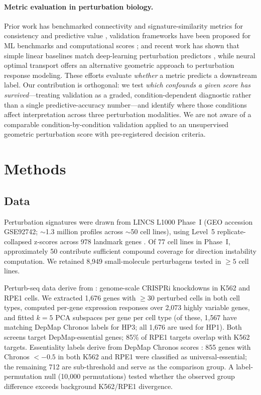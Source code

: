 \documentclass[11pt]{article}
\begin{document}
\paragraph{Metric evaluation in perturbation biology.}
Prior work has benchmarked connectivity and signature-similarity metrics
for consistency and predictive value
\citep{subramanian2017next,li2020comprehensive,napolitano2021reconciling},
validation
frameworks have been proposed for ML benchmarks and computational scores
\citep{freiesleben2025benchmarking,watson2025measuring}; and recent work
has shown that simple linear baselines match deep-learning perturbation
predictors \citep{ahlmanneltze2025baseline}, while neural optimal
transport \citep{bunne2023cellot} offers an alternative geometric
approach to perturbation response modeling. These efforts
evaluate \emph{whether} a metric predicts a downstream label. Our
contribution is orthogonal: we test \emph{which confounds a given score
has survived}---treating validation as a graded, condition-dependent
diagnostic rather than a single predictive-accuracy number---and
identify where those conditions affect interpretation across three
perturbation modalities. We are not aware of a comparable
condition-by-condition validation applied to an unsupervised geometric
perturbation score with pre-registered decision criteria.

\section{Methods}

\subsection{Data}

Perturbation signatures were drawn from LINCS L1000 Phase~I (GEO accession
GSE92742; $\sim$1.3 million profiles across $\sim$50 cell lines),
using Level~5 replicate-collapsed z-scores across 978 landmark genes
\citep{subramanian2017next,keenan2018library}. Of 77 cell lines in Phase~I,
approximately 50 contribute sufficient compound coverage for direction
instability computation. We retained 8{,}949
small-molecule perturbagens tested in $\geq5$ cell lines.

Perturb-seq data derive from \citet{replogle2022mapping}: genome-scale
CRISPRi knockdowns in K562 and RPE1 cells. We extracted 1{,}676 genes
with $\geq$30 perturbed cells in both cell types, computed per-gene
expression responses over 2{,}073 highly variable genes, and fitted
$k = 5$ PCA subspaces per gene per cell type (of these, 1{,}567 have
matching DepMap Chronos labels for HP3; all 1{,}676 are used for HP1).
Both screens target DepMap-essential genes; 85\% of RPE1 targets overlap
with K562 targets. Essentiality labels derive from DepMap Chronos scores
\citep{dempster2021chronos}: 855 genes with Chronos $< -0.5$ in both
K562 and RPE1 were classified as universal-essential; the remaining 712
are sub-threshold and serve as the comparison group. A label-permutation
null (10{,}000 permutations) tested whether the observed group difference
exceeds background K562/RPE1 divergence.
\end{document}
